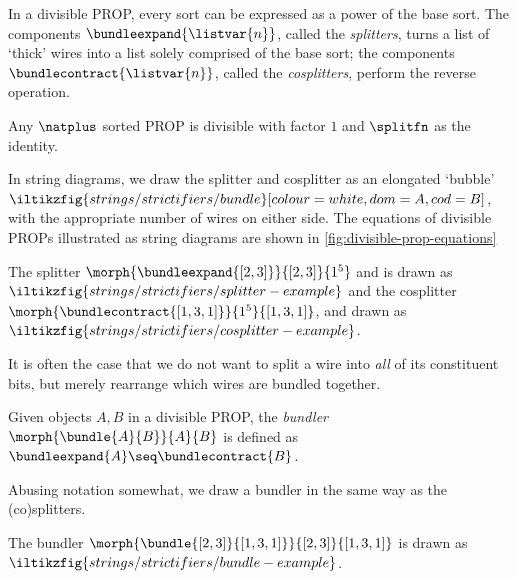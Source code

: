 In a divisible PROP, every sort can be expressed as a power of the base sort.
The components \(
    \bundleexpand{\listvar{n}}
\), called the \emph{splitters}, turns a list of `thick' wires into a list
solely comprised of the base sort; the components \(
    \bundlecontract{\listvar{n}}
\), called the \emph{cosplitters}, perform the reverse operation.

\begin{example}
    Any \(\natplus\) sorted PROP is divisible with factor \(1\) and
    \(\splitfn\) as the identity.
\end{example}

In string diagrams, we draw the splitter and cosplitter as an elongated `bubble'
\(
    \iltikzfig{strings/strictifiers/bundle}[colour=white,dom=A,cod=B]
\), with the appropriate number of wires on either side.
The equations of divisible PROPs illustrated as string diagrams are shown in
\cref{fig:divisible-prop-equations}

\begin{example}
    The splitter \(
        \morph{\bundleexpand{[2,3]}}{[2,3]}{1^5}
    \) and is drawn as \(
        \iltikzfig{strings/strictifiers/splitter-example}
    \) and the cosplitter \(
        \morph{\bundlecontract{[1,3,1]}}{1^5}{[1,3,1]}
    \), and drawn as \(
        \iltikzfig{strings/strictifiers/cosplitter-example}
    \).
\end{example}



It is often the case that we do not want to split a wire into \emph{all} of its
constituent bits, but merely rearrange which wires are bundled together.

\begin{definition}[Bundler]
    Given objects \(A,B\) in a divisible PROP, the \emph{bundler}
    \(\morph{\bundle{A}{B}}{A}{B}\) is defined as \(
        \bundleexpand{A} \seq \bundlecontract{B}
    \).
\end{definition}

Abusing notation somewhat, we draw a bundler in the same way as the
(co)splitters.

\begin{example}

    The bundler \(\morph{\bundle{[2,3]}{[1,3,1]}}{[2,3]}{[1,3,1]}\)
    is drawn as \(
        \iltikzfig{strings/strictifiers/bundle-example}
    \).
\end{example}